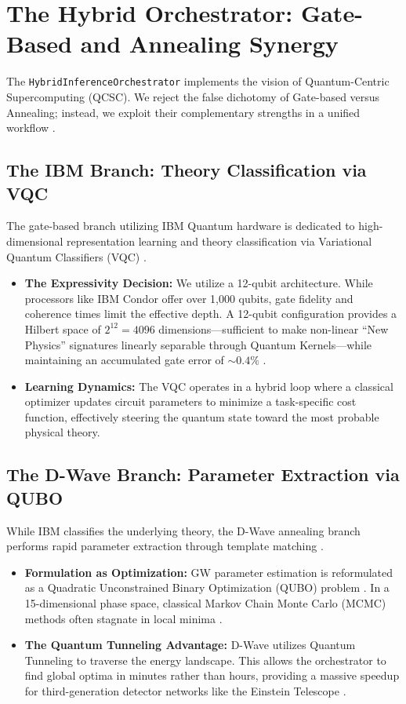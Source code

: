 \documentclass[11pt,a4paper,spanish]{book}
\numberwithin{equation}{chapter}
\numberwithin{figure}{chapter}
\numberwithin{equation}{chapter}
\numberwithin{figure}{chapter}
\numberwithin{table}{chapter}
\begin{document}
\section{The Hybrid Orchestrator: Gate-Based and Annealing Synergy}

The \texttt{HybridInferenceOrchestrator} implements the vision of Quantum-Centric Supercomputing (QCSC). We reject the false dichotomy of Gate-based versus Annealing; instead, we exploit their complementary strengths in a unified workflow \cite{networkworld_ibm_hybrid, nextgov_ibm_hybrid}.

\subsection{The IBM Branch: Theory Classification via VQC}

The gate-based branch utilizing IBM Quantum hardware is dedicated to high-dimensional representation learning and theory classification via Variational Quantum Classifiers (VQC) \cite{diposit_ub_vqc}.
\begin{itemize}
    \item \textbf{The Expressivity Decision:} We utilize a 12-qubit architecture. While processors like IBM Condor offer over 1,000 qubits, gate fidelity and coherence times limit the effective depth. A 12-qubit configuration provides a Hilbert space of $2^{12} = 4096$ dimensions—sufficient to make non-linear ``New Physics'' signatures linearly separable through Quantum Kernels—while maintaining an accumulated gate error of $\sim0.4\%$ \cite{openreview_quantum_kernels, arxiv260114036}.
    \item \textbf{Learning Dynamics:} The VQC operates in a hybrid loop where a classical optimizer updates circuit parameters to minimize a task-specific cost function, effectively steering the quantum state toward the most probable physical theory.
\end{itemize}

\subsection{The D-Wave Branch: Parameter Extraction via QUBO}

While IBM classifies the underlying theory, the D-Wave annealing branch performs rapid parameter extraction through template matching \cite{dwave_dual_platform}.
\begin{itemize}
    \item \textbf{Formulation as Optimization:} GW parameter estimation is reformulated as a Quadratic Unconstrained Binary Optimization (QUBO) problem \cite{docs_dwave_qubo}. In a 15-dimensional phase space, classical Markov Chain Monte Carlo (MCMC) methods often stagnate in local minima \cite{arxiv_parallel_nested_sampling}.
    \item \textbf{The Quantum Tunneling Advantage:} D-Wave utilizes Quantum Tunneling to traverse the energy landscape. This allows the orchestrator to find global optima in minutes rather than hours, providing a massive speedup for third-generation detector networks like the Einstein Telescope \cite{arxiv_parallel_nested_sampling}.
\end{itemize}
\end{document}
